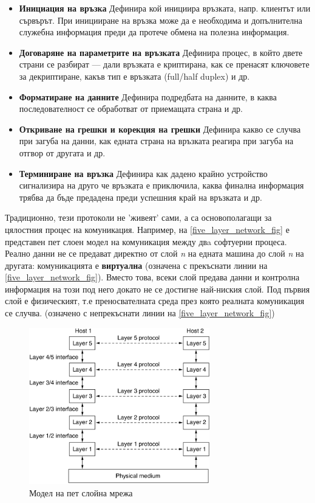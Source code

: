 \documentclass[12pt,a4paper,oneside]{book}
\begin{document}
\begin{itemize}
  \item \textbf{Инициация на връзка} Дефинира кой инициира връзката, напр.
    клиентът или сървърът. При иницииране на връзка може да е необходима и
    допълнителна служебна информация преди да протече обмена на полезна
    информация.
  \item \textbf{Договаряне на параметрите на връзката} Дефинира процес, в който
    двете страни се разбират --- дали връзката е криптирана, как се пренасят
    ключовете за декриптиране, какъв тип е връзката (full/half duplex) и др.
  \item \textbf{Форматиране на данните} Дефинира подредбата на данните, в каква
    последователност се обработват от приемащата страна и др.
  \item \textbf{Откриване на грешки и корекция на грешки} Дефинира какво се
    случва при загуба на данни, как едната страна на връзката реагира при загуба
    на отгвор от другата и др.
  \item \textbf{Терминиране на връзка} Дефинира как дадено крайно устройство
    сигнализира на друго че връзката е приключила, каква финална информация
    трябва да бъде предадена преди успешния край на връзката и др.
\end{itemize}

Традиционно, тези протоколи не 'живеят' сами, а са основополагащи за цялостния
процес на комуникация.  Например, на \autoref{five_layer_network_fig} е
представен пет слоен модел на комуникация между двa софтуерни процеса. Реално
данни не се предават директно от слой \textit{n} на едната машина до слой
\textit{n} на другата: комуникацията е \textbf{виртуална} (означена с прекъснати
линии на \autoref{five_layer_network_fig}).
Вместо това, всеки слой предава данни и контролна информация на този под него
докато не се достигне най-ниския слой. Под първия слой е физическият, т.е
преносвателната среда през която реалната комуникация се случва. (означено с
непрекъснати линии на \autoref{five_layer_network_fig})

\begin{figure}[h!]
  \centering
  \includegraphics[width=0.7\textwidth]{figures/five_layer_network.png}
  \caption{Модел на пет слойна мрежа}
  \label{five_layer_network_fig}
\end{figure}
\end{document}

